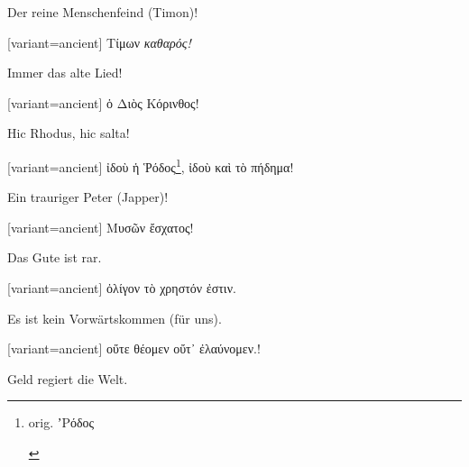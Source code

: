 Der reine Menschenfeind (Timon)!

\switchcolumn

\begin{greek}[variant=ancient]%
Τίμων \emph{καθαρός!}

\end{greek}%
\switchcolumn*

Immer das alte Lied!

\switchcolumn

\begin{greek}[variant=ancient]%
ὁ Διὸς Κόρινθος!

\end{greek}%
\switchcolumn*

\begin{latin}%
Hic Rhodus, hic salta!

\end{latin}%
\switchcolumn

\begin{greek}[variant=ancient]%
ἰδοὺ ἡ Ῥόδος\footnote{\begin{latin}%
orig. \textgreek[variant=ancient]{ʼΡόδος}\end{latin}%
}, ἰδοὺ καὶ τὸ πήδημα!

\end{greek}%
\switchcolumn*

Ein trauriger Peter (Japper)!

\switchcolumn

\begin{greek}[variant=ancient]%
Μυσῶν ἔσχατος!

\end{greek}%
\switchcolumn*

Das Gute ist rar.

\switchcolumn

\begin{greek}[variant=ancient]%
ὀλίγον τὸ χρηστόν ἐστιν.

\end{greek}%
\switchcolumn*

Es ist kein Vorwärts\textcompwordmark{}kommen (für uns).

\switchcolumn

\begin{greek}[variant=ancient]%
οὔτε θέομεν οὔτ᾽ ἐλαύνομεν.!

\end{greek}%
\switchcolumn*

Geld regiert die Welt.

\switchcolumn

